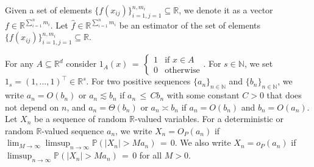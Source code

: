 \documentclass[twoside,11pt]{article}
\begin{document}

Given a set of elements $\{ f(x_{ij}) \}_{i=1,j=1}^{n,m_i} \subseteq \mathbb{R}$, 
we denote it as a vector $f \in \mathbb{R}^{\sum_{i=1}^n m_i}$. 
Let $\hat{f} \in \mathbb{R}^{\sum_{i=1}^n m_i}$ be an estimator of the set of elements $\{ f(x_{ij}) \}_{i=1,j=1}^{n,m_i} \subseteq \mathbb{R}$.  




For any $A \subseteq \mathbb{R}^d$ consider $1_A(x) \,=\, \begin{cases} 1 & \text{if } x \in A \\ 0 & \text{otherwise} \end{cases}$. For $s \in \mathbb{N}$, we set $1_s = (1, . . . ,1)^{\top} \in \mathbb{R}^s$. For two positive sequences $\{a_n\}_{n\in\mathbb{N}}$ and $\{b_n\}_{n\in\mathbb{N}}$, we write $a_n = O(b_n)$ or $a_n \lesssim b_n$ if $a_n \,\leq\, Cb_n$ with some constant $C > 0$ that does not depend on $n$, and $a_n = \Theta(b_n)$ or $a_n \asymp b_n$ if $a_n = O(b_n)$ and $b_n = O(a_n)$. Let $X_n$ be a sequence of random $\mathbb{R}$-valued variables. For a deterministic or random $\mathbb{R}$-valued sequence $a_n$, we write $X_n = O_P(a_n)$ if $\lim_{M\to\infty} \limsup_{n\to\infty} \mathbb{P}(|X_n| > Ma_n) \,=\, 0$. We also write $X_n = o_P(a_n)$ if $\limsup_{n\to\infty} \mathbb{P}(|X_n| > M a_n) \,=\, 0$ for all $M > 0$.
\end{document}
